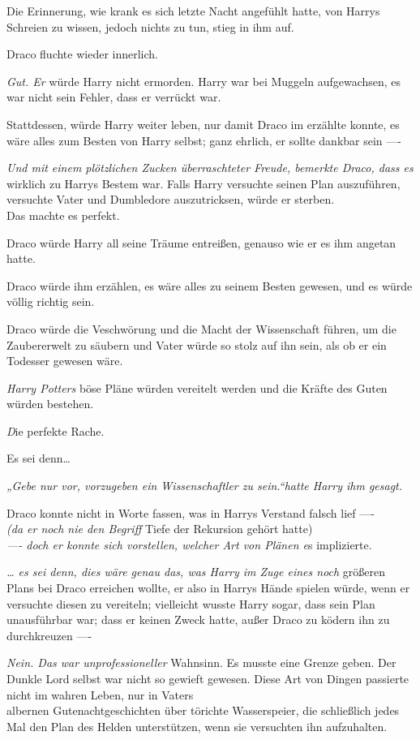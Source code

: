 {Die Erinnerung, wie krank es sich letzte Nacht angefühlt hatte, von Harrys Schreien zu wissen, jedoch nichts zu tun, stieg in ihm auf.

Draco fluchte wieder innerlich.

\emph{Gut. Er} würde Harry nicht ermorden. Harry war bei Muggeln aufgewachsen, es war nicht sein Fehler, dass er verrückt war.

Stattdessen, würde Harry weiter leben, nur damit Draco im erzählte konnte, es wäre alles zum Besten von Harry selbst; ganz ehrlich, er sollte dankbar sein ----

\emph{Und mit einem plötzlichen Zucken überraschteter Freude, bemerkte Draco, dass es} wirklich zu Harrys Bestem war. Falls Harry versuchte seinen Plan auszuführen, versuchte Vater und Dumbledore auszutricksen, würde er sterben.\\ Das machte es perfekt.

Draco würde Harry all seine Träume entreißen, genauso wie er es ihm angetan hatte.

Draco würde ihm erzählen, es wäre alles zu seinem Besten gewesen, und es würde völlig richtig sein.

Draco würde die Veschwörung und die Macht der Wissenschaft führen, um die Zaubererwelt zu säubern und Vater würde so stolz auf ihn sein, als ob er ein Todesser gewesen wäre.

\emph{Harry Potters} böse Pläne würden vereitelt werden und die Kräfte des Guten würden bestehen.

\emph{D}ie perfekte Rache.

Es sei denn…

\emph{„Gebe nur vor, vorzugeben ein Wissenschaftler zu sein.“hatte Harry ihm gesagt.}

Draco konnte nicht in Worte fassen, was in Harrys Verstand falsch lief ----\\ \emph{(da er noch nie den Begriff} Tiefe der Rekursion gehört hatte)\\ \emph{---- doch er konnte sich vorstellen, welcher Art von Plänen e}s implizierte.

\emph{… es sei denn, dies wäre genau das, was Harry im Zuge eines noch} größeren Plans bei Draco erreichen wollte, er also in Harrys Hände spielen würde, wenn er versuchte diesen zu vereiteln; vielleicht wusste Harry sogar, dass sein Plan unausführbar war; dass er keinen Zweck hatte, außer Draco zu ködern ihn zu durchkreuzen ----

\emph{Nein. Das war unprofessioneller} Wahnsinn. Es musste eine Grenze geben. Der Dunkle Lord selbst war nicht so gewieft gewesen. Diese Art von Dingen passierte nicht im wahren Leben, nur in Vaters\\ albernen Gutenachtgeschichten über törichte Wasserspeier, die schließlich jedes Mal den Plan des Helden unterstützen, wenn sie versuchten ihn aufzuhalten.

}
